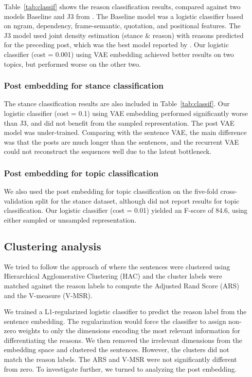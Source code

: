 \documentclass[11pt]{article}
\begin{document}
Table~\ref{tab:classif} shows the reason classification results,
compared against two models Baseline and J3 from \textcite{hasan2014you}.
The Baseline model was a logistic classifier based on ngram, dependency, frame-semantic, quotation, and positional features.
The J3 model used joint density estimation (stance \& reason) with reasons predicted for the preceding post,
which was the best model reported by \textcite{hasan2014you}.
Our logistic classifier (cost = 0.001) using VAE embedding achieved better results on two topics,
but performed worse on the other two.

\subsubsection*{Post embedding for stance classification}

The stance classification results are also included in Table~\ref{tab:classif}.
Our logistic classifier (cost = 0.1) using VAE embedding performed significantly worse than J3,
and did not benefit from the sampled representation.
The post VAE model was under-trained.
Comparing with the sentence VAE,
the main difference was that the posts are much longer than the sentences,
and the recurrent VAE could not reconstruct the sequences well due to the latent bottleneck.

\subsubsection*{Post embedding for topic classification}

We also used the post embedding for topic classification
on the five-fold cross-validation split for the stance dataset,
although \parencite{hasan2014you} did not report results for topic classification.
Our logistic classifier (cost = 0.01) yielded an F-score of 84.6,
using either sampled or unsampled representation.

\subsection{Clustering analysis}\label{sec:clustering-analysis}

We tried to follow the approach of \textcite{boltuvzic2015identifying}
where the sentences were clustered using Hierarchical Agglomerative Clustering (HAC)
and the cluster labels were matched against the reason labels
to compute the Adjusted Rand Score (ARS) and the V-measure (V-MSR).

We trained a L1-regularized logistic classifier to predict the reason label from the sentence embedding.
The regularization would force the classifier to assign non-zero weights to only the dimensions
encoding the most relevant information for differentiating the reasons.
We then removed the irrelevant dimensions from the embedding space and clustered the sentences.
However, the clusters did not match the reason labels.
The ARS and V-MSR were not significantly different from zero.
To investigate further, we turned to analyzing the post embedding.
\end{document}
